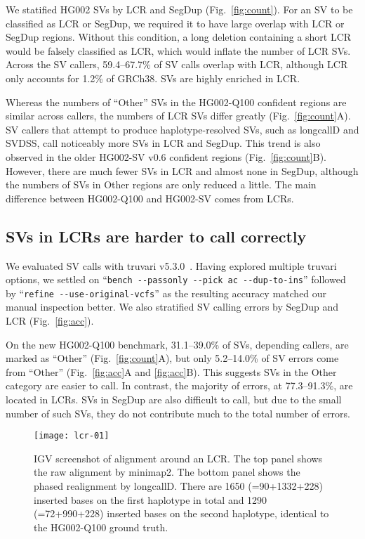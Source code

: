 \documentclass[a4paper,num-refs]{oup-contemporary}
\begin{document}
We statified HG002 SVs by LCR and SegDup (Fig.~\ref{fig:count}).
For an SV to be classified as LCR or SegDup, we required it to have large overlap with LCR or SegDup regions.
Without this condition, a long deletion containing a short LCR would be falsely classified as LCR, which would inflate the number of LCR SVs.
Across the SV callers, 59.4--67.7\% of SV calls overlap with LCR, although LCR only accounts for 1.2\% of GRCh38.
SVs are highly enriched in LCR.

Whereas the numbers of ``Other'' SVs in the HG002-Q100 confident regions are similar across callers,
the numbers of LCR SVs differ greatly (Fig.~\ref{fig:count}A).
SV callers that attempt to produce haplotype-resolved SVs, such as longcallD and SVDSS, call noticeably more SVs in LCR and SegDup.
This trend is also observed in the older HG002-SV v0.6 confident regions (Fig.~\ref{fig:count}B).
However, there are much fewer SVs in LCR and almost none in SegDup, although the numbers of SVs
in Other regions are only reduced a little.
The main difference between HG002-Q100 and HG002-SV comes from LCRs.

\subsection{SVs in LCRs are harder to call correctly}

We evaluated SV calls with truvari v5.3.0~\cite{English:2022aa}.
Having explored multiple truvari options,
we settled on ``{\tt bench -{}-passonly -{}-pick ac -{}-dup-to-ins}''
followed by ``{\tt refine -{}-use-original-vcfs}''
as the resulting accuracy matched our manual inspection better.
We also stratified SV calling errors by SegDup and LCR (Fig.~\ref{fig:acc}).

On the new HG002-Q100 benchmark, 31.1--39.0\% of SVs, depending callers, are marked as ``Other'' (Fig.~\ref{fig:count}A),
but only 5.2--14.0\% of SV errors come from ``Other'' (Fig.~\ref{fig:acc}A and \ref{fig:acc}B).
This suggests SVs in the Other category are easier to call.
In contrast, the majority of errors, at 77.3--91.3\%, are located in LCRs.
SVs in SegDup are also difficult to call, but due to the small number of such SVs,
they do not contribute much to the total number of errors.

\begin{figure}[tb]
\texttt{[image: lcr-01]}
\caption{IGV screenshot of alignment around an LCR.
The top panel shows the raw alignment by minimap2.
The bottom panel shows the phased realignment by longcallD.
There are 1650 (=90+1332+228) inserted bases on the first haplotype in total
and 1290 (=72+990+228) inserted bases on the second haplotype,
identical to the HG002-Q100 ground truth.
}\label{fig:ex}
\end{figure}
\end{document}
